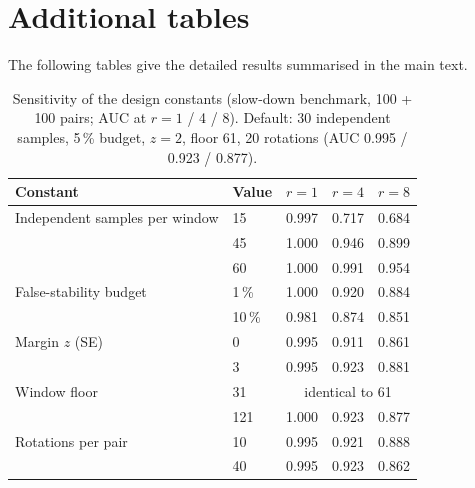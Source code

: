 \documentclass[11pt,a4paper]{article}
\begin{document}



\clearpage
\appendix
\section{Additional tables}
\label{app:tables}
The following tables give the detailed results summarised in the main text.

\begin{table}[t]
\centering
\caption{Sensitivity of the design constants (slow-down benchmark, 100 + 100 pairs; AUC at $r = 1$ / 4 / 8). Default: 30 independent samples, 5\,\% budget, $z = 2$, floor 61, 20 rotations (AUC 0.995 / 0.923 / 0.877).}
\label{tab:sensitivity}
\footnotesize
\begin{tabular}{llccc}
\toprule
Constant & Value & $r = 1$ & $r = 4$ & $r = 8$ \\
\midrule
Independent samples per window & 15 & 0.997 & 0.717 & 0.684 \\
 & 45 & 1.000 & 0.946 & 0.899 \\
 & 60 & 1.000 & 0.991 & 0.954 \\
False-stability budget & 1\,\% & 1.000 & 0.920 & 0.884 \\
 & 10\,\% & 0.981 & 0.874 & 0.851 \\
Margin $z$ (SE) & 0 & 0.995 & 0.911 & 0.861 \\
 & 3 & 0.995 & 0.923 & 0.881 \\
Window floor & 31 & \multicolumn{3}{c}{identical to 61} \\
 & 121 & 1.000 & 0.923 & 0.877 \\
Rotations per pair & 10 & 0.995 & 0.921 & 0.888 \\
 & 40 & 0.995 & 0.923 & 0.862 \\
\bottomrule
\end{tabular}
\end{table}
\end{document}
